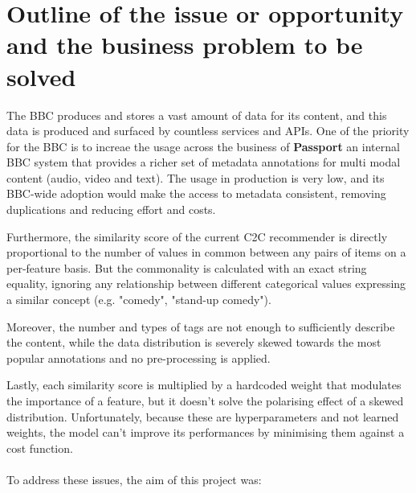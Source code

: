 
\section{Outline of the issue or opportunity and the business problem to be solved}

The BBC produces and stores a vast amount of data for its content, and this data is produced and surfaced by countless services and APIs.
One of the priority for the BBC is to increae the usage across the business of \textbf{Passport} \cite{BBC:PassportMetadata} an internal BBC
system that provides a richer set of metadata annotations for multi modal content (audio, video and text).
The usage in production is very low, and its BBC-wide adoption would make the access to metadata consistent,
removing duplications and reducing effort and costs.

Furthermore, the similarity score of the current C2C recommender is directly proportional to the number of values in common between any pairs of items
on a per-feature basis. But the commonality is calculated with an exact string equality, ignoring any relationship between different
categorical values expressing a similar concept (e.g. "comedy", "stand-up comedy").

Moreover, the number and types of tags are not enough to sufficiently
describe the content, while the data distribution is severely skewed towards the most popular annotations and no pre-processing
is applied.

Lastly, each similarity score is multiplied by a hardcoded weight that modulates the importance of a feature, but it doesn't solve
the polarising effect of a skewed distribution. Unfortunately, because these are hyperparameters and not learned weights, the model can't improve
its performances by minimising them against a cost function.
\\ \\
To address these issues, the aim of this project was:

